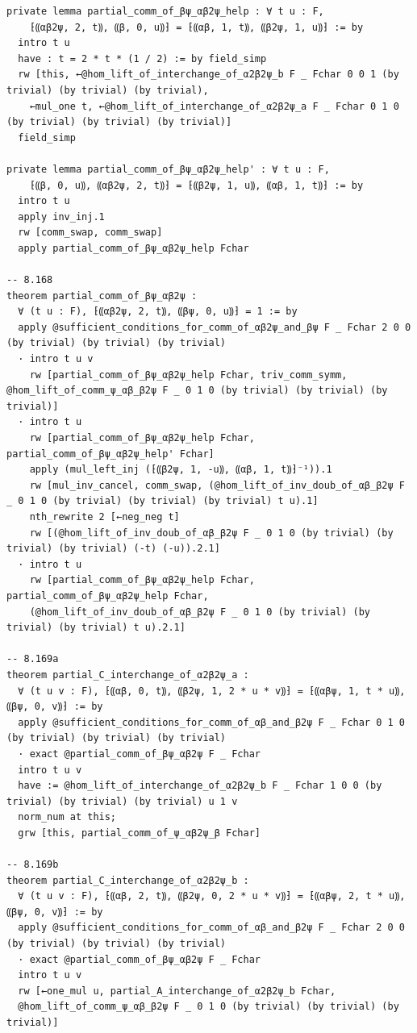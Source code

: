 \documentclass[10pt,a4paper]{article}
\begin{document}
\begin{Verbatim}
private lemma partial_comm_of_βψ_αβ2ψ_help : ∀ t u : F,
    ⁅⸨αβ2ψ, 2, t⸩, ⸨β, 0, u⸩⁆ = ⁅⸨αβ, 1, t⸩, ⸨β2ψ, 1, u⸩⁆ := by
  intro t u
  have : t = 2 * t * (1 / 2) := by field_simp
  rw [this, ←@hom_lift_of_interchange_of_α2β2ψ_b F _ Fchar 0 0 1 (by trivial) (by trivial) (by trivial),
    ←mul_one t, ←@hom_lift_of_interchange_of_α2β2ψ_a F _ Fchar 0 1 0 (by trivial) (by trivial) (by trivial)]
  field_simp

private lemma partial_comm_of_βψ_αβ2ψ_help' : ∀ t u : F,
    ⁅⸨β, 0, u⸩, ⸨αβ2ψ, 2, t⸩⁆ = ⁅⸨β2ψ, 1, u⸩, ⸨αβ, 1, t⸩⁆ := by
  intro t u
  apply inv_inj.1
  rw [comm_swap, comm_swap]
  apply partial_comm_of_βψ_αβ2ψ_help Fchar

-- 8.168
theorem partial_comm_of_βψ_αβ2ψ :
  ∀ (t u : F), ⁅⸨αβ2ψ, 2, t⸩, ⸨βψ, 0, u⸩⁆ = 1 := by
  apply @sufficient_conditions_for_comm_of_αβ2ψ_and_βψ F _ Fchar 2 0 0 (by trivial) (by trivial) (by trivial)
  · intro t u v
    rw [partial_comm_of_βψ_αβ2ψ_help Fchar, triv_comm_symm, @hom_lift_of_comm_ψ_αβ_β2ψ F _ 0 1 0 (by trivial) (by trivial) (by trivial)]
  · intro t u
    rw [partial_comm_of_βψ_αβ2ψ_help Fchar, partial_comm_of_βψ_αβ2ψ_help' Fchar]
    apply (mul_left_inj (⁅⸨β2ψ, 1, -u⸩, ⸨αβ, 1, t⸩⁆⁻¹)).1
    rw [mul_inv_cancel, comm_swap, (@hom_lift_of_inv_doub_of_αβ_β2ψ F _ 0 1 0 (by trivial) (by trivial) (by trivial) t u).1]
    nth_rewrite 2 [←neg_neg t]
    rw [(@hom_lift_of_inv_doub_of_αβ_β2ψ F _ 0 1 0 (by trivial) (by trivial) (by trivial) (-t) (-u)).2.1]
  · intro t u
    rw [partial_comm_of_βψ_αβ2ψ_help Fchar, partial_comm_of_βψ_αβ2ψ_help Fchar,
    (@hom_lift_of_inv_doub_of_αβ_β2ψ F _ 0 1 0 (by trivial) (by trivial) (by trivial) t u).2.1]

-- 8.169a
theorem partial_C_interchange_of_α2β2ψ_a :
  ∀ (t u v : F), ⁅⸨αβ, 0, t⸩, ⸨β2ψ, 1, 2 * u * v⸩⁆ = ⁅⸨αβψ, 1, t * u⸩, ⸨βψ, 0, v⸩⁆ := by
  apply @sufficient_conditions_for_comm_of_αβ_and_β2ψ F _ Fchar 0 1 0 (by trivial) (by trivial) (by trivial)
  · exact @partial_comm_of_βψ_αβ2ψ F _ Fchar
  intro t u v
  have := @hom_lift_of_interchange_of_α2β2ψ_b F _ Fchar 1 0 0 (by trivial) (by trivial) (by trivial) u 1 v
  norm_num at this;
  grw [this, partial_comm_of_ψ_αβ2ψ_β Fchar]

-- 8.169b
theorem partial_C_interchange_of_α2β2ψ_b :
  ∀ (t u v : F), ⁅⸨αβ, 2, t⸩, ⸨β2ψ, 0, 2 * u * v⸩⁆ = ⁅⸨αβψ, 2, t * u⸩, ⸨βψ, 0, v⸩⁆ := by
  apply @sufficient_conditions_for_comm_of_αβ_and_β2ψ F _ Fchar 2 0 0 (by trivial) (by trivial) (by trivial)
  · exact @partial_comm_of_βψ_αβ2ψ F _ Fchar
  intro t u v
  rw [←one_mul u, partial_A_interchange_of_α2β2ψ_b Fchar,
  @hom_lift_of_comm_ψ_αβ_β2ψ F _ 0 1 0 (by trivial) (by trivial) (by trivial)]


\end{Verbatim}
\end{document}
